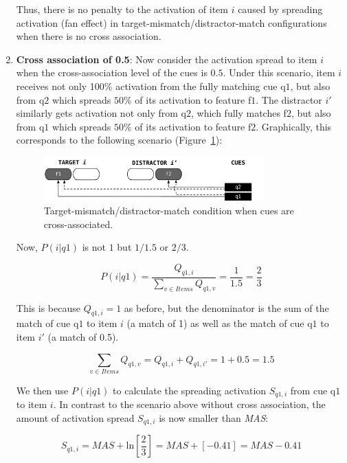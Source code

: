 \documentclass{cambridge7A}\usepackage[]{graphicx}\usepackage[]{color}
\begin{document}
\begin{enumerate}
Thus, there is no penalty to the activation of item $i$ caused by spreading activation (fan effect) in target-mismatch/distractor-match configurations when there is no cross association. 

\item \textbf{Cross association of 0.5}:
Now consider the activation spread to item $i$ when the cross-association level of the cues is $0.5$. Under this scenario, item $i$ receives not only 100\%  activation from the fully matching cue q$1$, but also from q$2$ which spreads $50\%$ of its activation to feature f$1$. The distractor $i'$ similarly gets activation not only from  q$2$, which fully matches  f$2$, but also from  q$1$ which spreads $50\%$ of its activation to feature f$2$.   Graphically, this corresponds to the following scenario (Figure~\ref{fig:implFig2}):

\begin{figure}[htbp]
	\centering
	\includegraphics[width=0.80\textwidth]{figures/implFig2}
	\caption{Target-mismatch/distractor-match condition when cues are cross-associated.}
	\label{fig:implFig2}
\end{figure}

Now, $P(i|q1)$ is not $1$ but $1/1.5$ or $2/3$.  

\begin{equation} \label{eq:newfannoxassoc3}
	P(i|q1) = \frac{Q_{q1,i}}{\sum\limits_{v\in Items} Q_{q1,v}} = \frac{1}{1.5} = \frac{2}{3}
\end{equation}

This is because $Q_{q1,i} = 1$  as before, but the denominator is the sum of the match of cue q$1$ to item $i$ (a match of 1) as well as the match of cue q$1$ to item $i'$ (a match of 0.5).

\begin{equation}
\sum\limits_{v\in Items} Q_{q1,v} = Q_{q1,i} + Q_{q1,i'} = 1 + 0.5 = 1.5
\end{equation}

We then use $P(i|q1)$ to calculate the spreading activation $S_{q1,i}$ from cue q$1$ to item $i$. In contrast to the scenario above without cross association, the amount of activation spread $S_{q1,i}$ is now smaller than \textit{MAS}:

\begin{equation}
S_{q1,i} = \textit{MAS} + \text{ln}\left[\frac{2}{3}\right] =  \textit{MAS} + [-0.41] = \textit{MAS} - 0.41
\end{equation}


\end{enumerate}
\end{document}
